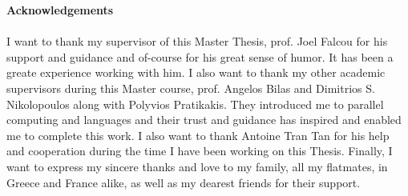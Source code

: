 \thispagestyle{empty}
\begin{titlepage}
{\bf\Large Acknowledgements}\\
\paragraph{}
I want to thank my supervisor of this Master Thesis, prof. Joel Falcou for his support and guidance and of-course
for his great sense of humor. It has been a greate experience working with him. I also want to thank my 
other academic supervisors during this Master course, prof. Angelos Bilas and Dimitrios S. Nikolopoulos along with 
Polyvios Pratikakis. They introduced me to parallel computing and languages and their trust and guidance has
inspired and enabled me to complete this work. I also want to thank Antoine Tran Tan for his help and cooperation during the
time I have been working on this Thesis. Finally, I want to express my sincere thanks and love to my family, all my
flatmates, in Greece and France alike, as well as my dearest friends for their support. 

\vfill
\end{titlepage}
